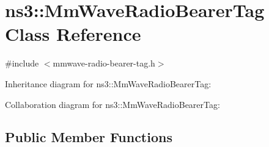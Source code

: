 \hypertarget{classns3_1_1MmWaveRadioBearerTag}{}\section{ns3\+:\+:Mm\+Wave\+Radio\+Bearer\+Tag Class Reference}
\label{classns3_1_1MmWaveRadioBearerTag}


{\ttfamily \#include $<$mmwave-\/radio-\/bearer-\/tag.\+h$>$}



Inheritance diagram for ns3\+:\+:Mm\+Wave\+Radio\+Bearer\+Tag\+:


Collaboration diagram for ns3\+:\+:Mm\+Wave\+Radio\+Bearer\+Tag\+:
\subsection*{Public Member Functions}

